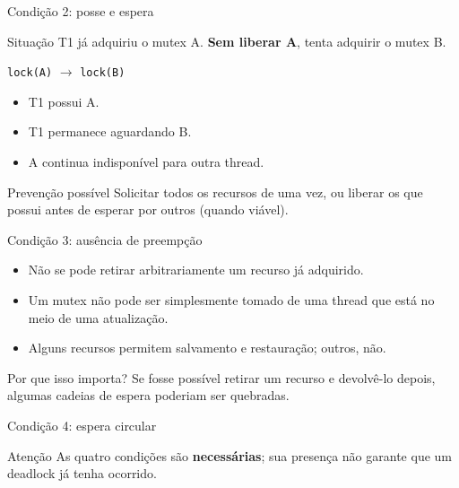 \documentclass[aspectratio=169,11pt]{beamer}
\begin{document}
\begin{frame}{Condição 2: posse e espera}
\small
\begin{block}{Situação}
T1 já adquiriu o mutex A. \textbf{Sem liberar A}, tenta adquirir o mutex B.
\end{block}
\begin{center}
\texttt{lock(A)} $\longrightarrow$ \texttt{lock(B)}
\end{center}
\begin{itemize}
\item T1 possui A.
\item T1 permanece aguardando B.
\item A continua indisponível para outra thread.
\end{itemize}
\begin{alertblock}{Prevenção possível}
Solicitar todos os recursos de uma vez, ou liberar os que possui antes de esperar por outros (quando viável).
\end{alertblock}
\end{frame}

\begin{frame}{Condição 3: ausência de preempção}
\small
\begin{itemize}
\setlength\itemsep{.65em}
\item Não se pode retirar arbitrariamente um recurso já adquirido.
\item Um mutex não pode ser simplesmente tomado de uma thread que está no meio de uma atualização.
\item Alguns recursos permitem salvamento e restauração; outros, não.
\end{itemize}
\begin{block}{Por que isso importa?}
Se fosse possível retirar um recurso e devolvê-lo depois, algumas cadeias de espera poderiam ser quebradas.
\end{block}
\end{frame}

\begin{frame}{Condição 4: espera circular}
\small
\centering
{}
\vspace{.1cm}
\begin{block}{Atenção}
As quatro condições são \textbf{necessárias}; sua presença não garante que um deadlock já tenha ocorrido.
\end{block}
\end{frame}
\end{document}
